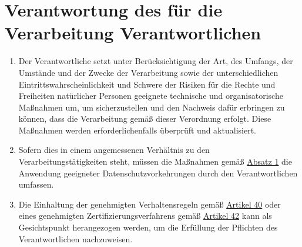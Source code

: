 \chapter{Verantwortung des für die Verarbeitung Verantwortlichen}
\label{ch:24}


\begin{enumerate}

  \item Der Verantwortliche setzt unter Berücksichtigung der Art, des Umfangs, der Umstände und der Zwecke der
   Verarbeitung sowie der unterschiedlichen Eintrittswahrscheinlichkeit und Schwere der Risiken für die Rechte und
   Freiheiten natürlicher Personen geeignete technische und organisatorische Maßnahmen um, um sicherzustellen und den
   Nachweis dafür erbringen zu können, dass die Verarbeitung gemäß dieser Verordnung erfolgt. Diese Maßnahmen werden
   erforderlichenfalls überprüft und aktualisiert.
  \label{itm:24-1}

  \item Sofern dies in einem angemessenen Verhältnis zu den Verarbeitungstätigkeiten steht, müssen die Maßnahmen gemäß
   \hyperref[itm:24-1]{Absatz 1} die Anwendung geeigneter Datenschutzvorkehrungen durch den Verantwortlichen umfassen.
  \label{itm:24-2}

  \item Die Einhaltung der genehmigten Verhaltensregeln gemäß \hyperref[ch:40]{Artikel 40} oder eines genehmigten
   Zertifizierungsverfahrens gemäß \hyperref[ch:42]{Artikel 42} kann als Gesichtspunkt herangezogen werden, um die
   Erfüllung der Pflichten des Verantwortlichen nachzuweisen.
  \label{itm:24-3}

\end{enumerate}



